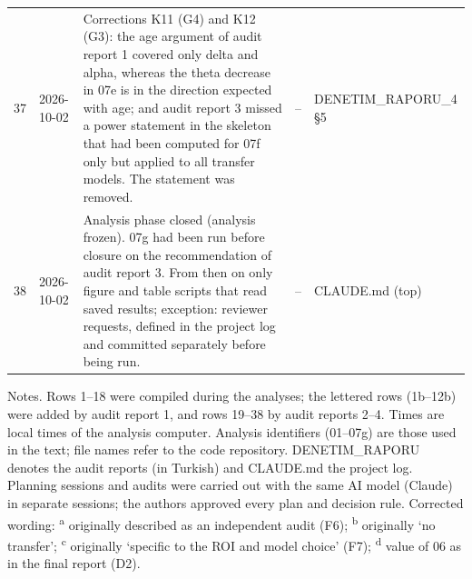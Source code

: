 \begin{longtable}{@{}p{0.6cm}p{1.9cm}p{6.8cm}p{2.8cm}p{2.3cm}@{}}
37 & \raggedright 2026-10-02 & Corrections K11 (G4) and K12 (G3): the age argument of audit report 1 covered only delta and alpha, whereas the theta decrease in 07e is in the direction expected with age; and audit report 3 missed a power statement in the skeleton that had been computed for 07f only but applied to all transfer models. The statement was removed. & \raggedright -- & \raggedright DENETIM\_\allowbreak{}RAPORU\_\allowbreak{}4 \S{}5 \tabularnewline
38 & \raggedright 2026-10-02 & Analysis phase closed (analysis frozen). 07g had been run before closure on the recommendation of audit report 3. From then on only figure and table scripts that read saved results; exception: reviewer requests, defined in the project log and committed separately before being run. & \raggedright -- & \raggedright CLAUDE.md (top) \tabularnewline
\end{longtable}
\vspace{-0.5\baselineskip}
{\scriptsize\noindent Notes. Rows 1--18 were compiled during the analyses; the lettered rows (1b--12b) were added by audit report 1, and rows 19--38 by audit reports 2--4. Times are local times of the analysis computer. Analysis identifiers (01--07g) are those used in the text; file names refer to the code repository. DENETIM\_\allowbreak{}RAPORU denotes the audit reports (in Turkish) and CLAUDE.md the project log. Planning sessions and audits were carried out with the same AI model (Claude) in separate sessions; the authors approved every plan and decision rule. Corrected wording: \textsuperscript{a} originally described as an independent audit (F6); \textsuperscript{b} originally `no transfer'; \textsuperscript{c} originally `specific to the ROI and model choice' (F7); \textsuperscript{d} value of 06 as in the final report (D2).\par}
\endgroup
